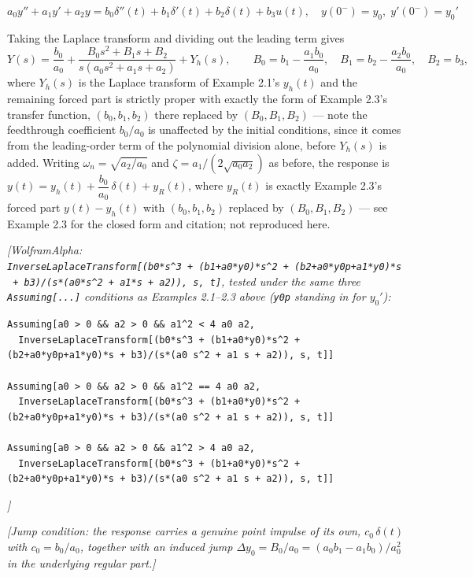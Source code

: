 \documentclass[
  11pt,
]{article}
\begin{document}
\[
a_0 y'' + a_1 y' + a_2 y = b_0 \delta''(t) + b_1 \delta'(t) + b_2 \delta(t) + b_3 u(t), \quad y(0^-) = y_0, \; y'(0^-) = y_0'
\]

Taking the Laplace transform and dividing out the leading term gives \[
Y(s) = \frac{b_0}{a_0} + \frac{B_0 s^2 + B_1 s + B_2}{s(a_0 s^2+a_1 s+a_2)} + Y_h(s), \qquad B_0 = b_1 - \frac{a_1 b_0}{a_0}, \quad B_1 = b_2 - \frac{a_2 b_0}{a_0}, \quad B_2 = b_3,
\] where \(Y_h(s)\) is the Laplace transform of Example 2.1's \(y_h(t)\)
and the remaining forced part is strictly proper with exactly the form
of Example 2.3's transfer function, \((b_0,b_1,b_2)\) there replaced by
\((B_0,B_1,B_2)\) --- note the feedthrough coefficient \(b_0/a_0\) is
unaffected by the initial conditions, since it comes from the
leading-order term of the polynomial division alone, before \(Y_h(s)\)
is added. Writing \(\omega_n=\sqrt{a_2/a_0}\) and
\(\zeta=a_1/(2\sqrt{a_0a_2})\) as before, the response is
\(y(t) = y_h(t) + \dfrac{b_0}{a_0}\,\delta(t) + y_R(t)\), where
\(y_R(t)\) is exactly Example 2.3's forced part \(y(t)-y_h(t)\) with
\((b_0,b_1,b_2)\) replaced by \((B_0,B_1,B_2)\) --- see Example 2.3 for
the closed form and citation; not reproduced here.

\emph{{[}WolframAlpha:
\texttt{InverseLaplaceTransform{[}(b0*s\^{}3\ +\ (b1+a0*y0)*s\^{}2\ +\ (b2+a0*y0p+a1*y0)*s\ +\ b3)/(s*(a0*s\^{}2\ +\ a1*s\ +\ a2)),\ s,\ t{]}},
tested under the same three \texttt{Assuming{[}...{]}} conditions as
Examples 2.1--2.3 above (\texttt{y0p} standing in for \(y_0'\)):}

\begin{verbatim}
Assuming[a0 > 0 && a2 > 0 && a1^2 < 4 a0 a2,
  InverseLaplaceTransform[(b0*s^3 + (b1+a0*y0)*s^2 + (b2+a0*y0p+a1*y0)*s + b3)/(s*(a0 s^2 + a1 s + a2)), s, t]]

Assuming[a0 > 0 && a2 > 0 && a1^2 == 4 a0 a2,
  InverseLaplaceTransform[(b0*s^3 + (b1+a0*y0)*s^2 + (b2+a0*y0p+a1*y0)*s + b3)/(s*(a0 s^2 + a1 s + a2)), s, t]]

Assuming[a0 > 0 && a2 > 0 && a1^2 > 4 a0 a2,
  InverseLaplaceTransform[(b0*s^3 + (b1+a0*y0)*s^2 + (b2+a0*y0p+a1*y0)*s + b3)/(s*(a0 s^2 + a1 s + a2)), s, t]]
\end{verbatim}

\emph{{]}}

\emph{{[}Jump condition: the response carries a genuine point impulse of
its own, \(c_0\,\delta(t)\) with \(c_0 = b_0/a_0\), together with an
induced jump \(\Delta y_0 = B_0/a_0 = (a_0 b_1 - a_1 b_0)/a_0^2\) in the
underlying regular part.{]}}
\end{document}
